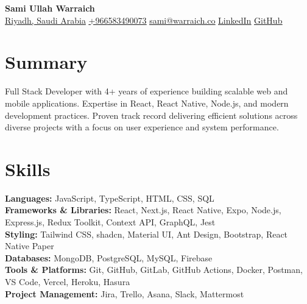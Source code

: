 \documentclass[letterpaper,11pt]{article}
\begin{document}
\noindent
\begin{minipage}[c]{0.78\textwidth}
  \centering
  \textbf{\Huge Sami Ullah Warraich} \\[6pt]
  \underline{Riyadh, Saudi Arabia} \textbar{}
  \href{tel:+966583490073}{\underline{+966583490073}} \textbar{}
  \href{mailto:sami@warraich.co}{\underline{sami@warraich.co}} \textbar{}
  \href{https://linkedin.com/in/samiwarra1ch}{\underline{LinkedIn}} \textbar{} 
  \href{https://github.com/samiwarraich}{\underline{GitHub}}
\end{minipage}%
\hfill
\begin{minipage}[c]{0.2\textwidth}
  \raggedleft
  \vspace{-1em}
\end{minipage}



\section{Summary}
\begin{itemize}[leftmargin=0.15in, label={}]
  \small{\item{
    Full Stack Developer with 4+ years of experience building scalable web and mobile applications. Expertise in React, React Native, Node.js, and modern development practices. Proven track record delivering efficient solutions across diverse projects with a focus on user experience and system performance.
  }}
\end{itemize}

\section{Skills}
\begin{itemize}[leftmargin=0.15in, label={}]
  \small{\item{
    \textbf{Languages:} JavaScript, TypeScript, HTML, CSS, SQL \\
    \textbf{Frameworks \& Libraries:} React, Next.js, React Native, Expo, Node.js, Express.js, Redux Toolkit, Context API, GraphQL, Jest \\
    \textbf{Styling:} Tailwind CSS, shadcn, Material UI, Ant Design, Bootstrap, React Native Paper \\
    \textbf{Databases:} MongoDB, PostgreSQL, MySQL, Firebase \\
    \textbf{Tools \& Platforms:} Git, GitHub, GitLab, GitHub Actions, Docker, Postman, VS Code, Vercel, Heroku, Hasura \\
    \textbf{Project Management:} Jira, Trello, Asana, Slack, Mattermost
  }}
\end{itemize}
\end{document}
